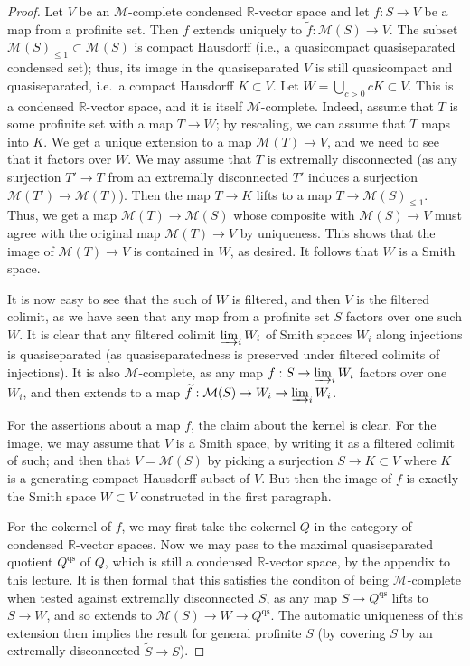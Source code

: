 \documentclass[11pt]{amsbook}
\renewcommand*{\tilde}{\widetilde}
\numberwithin{equation}{section}
\numberwithin{theorem}{section}
\theoremstyle{definition}
\begin{document}
\begin{proof} Let $V$ be an $\mathcal M$-complete condensed $\mathbb R$-vector space and let $f: S\to V$ be a map from a profinite set. Then $f$ extends uniquely to $\tilde{f}: \mathcal M(S)\to V$. The subset $\mathcal M(S)_{\leq 1}\subset\mathcal M(S)$ is compact Hausdorff (i.e., a quasicompact quasiseparated condensed set); thus, its image in the quasiseparated $V$ is still quasicompact and quasiseparated, i.e.~a compact Hausdorff $K\subset V$. Let $W=\bigcup_{c>0} cK\subset V$. This is a condensed $\mathbb R$-vector space, and it is itself $\mathcal M$-complete. Indeed, assume that $T$ is some profinite set with a map $T\to W$; by rescaling, we can assume that $T$ maps into $K$. We get a unique extension to a map $\mathcal M(T)\to V$, and we need to see that it factors over $W$. We may assume that $T$ is extremally disconnected (as any surjection $T'\to T$ from an extremally disconnected $T'$ induces a surjection $\mathcal M(T')\to \mathcal M(T)$). Then the map $T\to K$ lifts to a map $T\to \mathcal M(S)_{\leq 1}$. Thus, we get a map $\mathcal M(T)\to \mathcal M(S)$ whose composite with $\mathcal M(S)\to V$ must agree with the original map $\mathcal M(T)\to V$ by uniqueness. This shows that the image of $\mathcal M(T)\to V$ is contained in $W$, as desired. It follows that $W$ is a Smith space.

It is now easy to see that the such of $W$ is filtered, and then $V$ is the filtered colimit, as we have seen that any map from a profinite set $S$ factors over one such $W$. It is clear that any filtered colimit $\varinjlim_i W_i$ of Smith spaces $W_i$ along injections is quasiseparated (as quasiseparatedness is preserved under filtered colimits of injections). It is also $\mathcal M$-complete, as any map $f: S\to \varinjlim_i W_i$ factors over one $W_i$, and then extends to a map $\tilde{f}: \mathcal M(S)\to W_i\to \varinjlim_i W_i$.

For the assertions about a map $f$, the claim about the kernel is clear. For the image, we may assume that $V$ is a Smith space, by writing it as a filtered colimit of such; and then that $V=\mathcal M(S)$ by picking a surjection $S\to K\subset V$ where $K$ is a generating compact Hausdorff subset of $V$. But then the image of $f$ is exactly the Smith space $W\subset V$ constructed in the first paragraph.

For the cokernel of $f$, we may first take the cokernel $Q$ in the category of condensed $\mathbb R$-vector spaces. Now we may pass to the maximal quasiseparated quotient $Q^{\mathrm{qs}}$ of $Q$, which is still a condensed $\mathbb R$-vector space, by the appendix to this lecture. It is then formal that this satisfies the conditon of being $\mathcal M$-complete when tested against extremally disconnected $S$, as any map $S\to Q^{\mathrm{qs}}$ lifts to $S\to W$, and so extends to $\mathcal M(S)\to W\to Q^{\mathrm{qs}}$. The automatic uniqueness of this extension then implies the result for general profinite $S$ (by covering $S$ by an extremally disconnected $\tilde{S}\to S$).
\end{proof}
\end{document}
